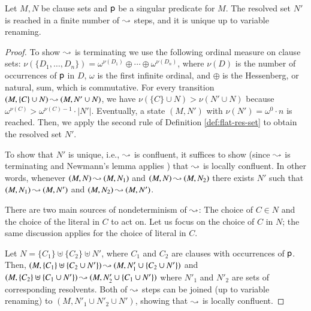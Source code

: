 \begin{rep}
\begin{lemma}
   \label{lem:flat-res-set-termination-confluence}
   Let $M, N$ be clause sets and $\mathsf{p}$ be a singular predicate for
   $M$. The resolved set $N'$ is reached in a finite number of $\mathbin\leadsto$ steps,
   and it is unique up to variable renaming.
\end{lemma}
\begin{proof}
   To show $\mathbin\leadsto$ is terminating we use the following ordinal measure on
   clause sets: $\nu(\{D_1,\dotsc,\allowbreak D_n\}) = \omega^{\nu(D_1)} \oplus
   \cdots \oplus \omega^{\nu(D_n)}$, where $\nu(D)$ is the number of
   occurrences of $\mathsf{p}$ in $D$, $\omega$ is the first infinite ordinal, and
   $\oplus$ is the Hessenberg, or natural, sum, which is commutative.
   For every transition
   $(M, \{C\} \cup N) \mathbin\leadsto (M, N' \cup N)$, we have $\nu(\{C\} \cup N) > \nu(N' \cup N)$
   because $\omega^{\nu(C)} > \omega^{\nu(C)-1} \cdot |N'|$.
   Eventually, a state $(M,N')$ with $\nu(N')=\omega^0\cdot n$ is reached.
   Then, we apply the second rule of Definition \ref{def:flat-res-set} to obtain the resolved set $N'$.

   To show that $N'$ is unique, i.e., $\mathbin\leadsto$ is confluent, it suffices
   to show (since $\mathbin\leadsto$ is terminating and Newmann's lemma applies
   \cite{bn-98-tr-and-all-that}) that $\mathbin\leadsto$ is locally confluent. In
   other words, whenever $(M,N) \mathbin\leadsto (M, N_1)$ and $(M,N) \mathbin\leadsto
   (M, N_2)$ there exists $N'$ such that $(M, N_1) \mathbin\leadsto (M, N')$ and
   $(M, N_2) \mathbin\leadsto (M,N')$. 
   
   There are two main sources of nondeterminism of $\mathbin\leadsto$: The choice of $C
   \in N$ and the choice of the literal in $C$ to act on. Let us focus on the choice of
   $C$ in $N$; the same discussion applies for the choice of literal in $C$.

   Let $N = \{C_1\} \uplus \{C_2\} \uplus N'$, where $C_1$ and $C_2$ are
   clauses with occurrences of $\mathsf{p}$. Then, $(M, \{C_1\} \uplus \{ C_2 \cup
   N' \}) \mathbin\leadsto (M, N'_1 \cup \{ C_2 \cup N'\})$ and $(M, \{C_2\} \uplus
   \{C_1 \cup N' \}) \mathbin\leadsto (M, N'_2 \cup \{ C_1 \cup N' \})$ where $N'_1$ and
   $N'_2$ are sets of corresponding resolvents. Both of $\mathbin\leadsto$ steps can
   be joined (up to variable renaming) to $(M, N'_1 \cup N'_2 \cup N')$, showing
   that $\mathbin\leadsto$ is locally confluent.
\end{proof}
\end{rep}

